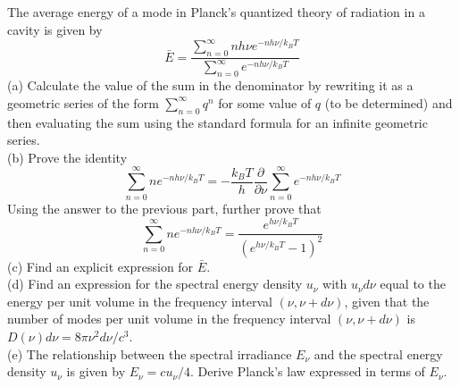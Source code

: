 \documentclass[12pt]{article}
\newenvironment{problem}[2][Problem]{\begin{trivlist}
\item[\hskip \labelsep {\bfseries #1}\hskip \labelsep {\bfseries #2.}]}{\end{trivlist}}
\begin{document}
\begin{problem}{2}
The average energy of a mode in Planck’s quantized theory of radiation in a cavity is given by
\[
\bar{E}=\frac{\sum_{n=0}^{\infty}nh\nu e^{-nh\nu/k_BT}}{\sum_{n=0}^{\infty}e^{-nh\nu/k_BT}}
\]
(a) Calculate the value of the sum in the denominator by rewriting it as a geometric series of the form $\sum_{n=0}^{\infty}q^n$ for some value of $q$ (to be determined) and then evaluating the sum using the standard formula for an infinite geometric series.\\
(b) Prove the identity
\[
\sum_{n=0}^{\infty}ne^{-nh\nu/k_BT}=-\frac{k_BT}{h}\frac{\partial}{\partial\nu}\sum_{n=0}^{\infty}e^{-nh\nu/k_BT}
\]
Using the answer to the previous part, further prove that
\[
\sum_{n=0}^{\infty}ne^{-nh\nu/k_BT}=\frac{e^{h\nu/k_BT}}{(e^{h\nu/k_BT}-1)^2}
\]
(c) Find an explicit expression for $\bar{E}$.\\
(d) Find an expression for the spectral energy density $u_{\nu}$ with $u_{\nu}d\nu$ equal to the energy per unit volume in the frequency interval $(\nu,\nu+d\nu)$, given that the number of modes per unit volume in the frequency interval $(\nu,\nu+d\nu)$ is $D(\nu)d\nu=8\pi\nu^2d\nu/c^3$.\\
(e) The relationship between the spectral irradiance $E_{\nu}$ and the spectral energy density $u_{\nu}$ is given by $E_{\nu}=cu_{\nu}/4$. Derive Planck's law expressed in terms of $E_{\nu}$.
\end{problem}
\end{document}
